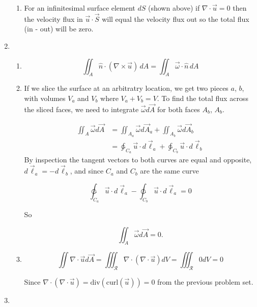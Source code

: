\documentclass[11pt,twoside]{article}
\newcommand{\vect}[1]{\vec{#1}}
\newcommand{\grad}{\nabla}
\newcommand{\cross}{\times}
\newcommand{\curl}{\mbox{curl}}
\newcommand{\divf}{\mbox{div}}
\newcommand{\lint}{\ointctrclockwise}
\begin{document}
\begin{enumerate}
\begin{enumerate}

\item For an infinitesimal surface element $dS$ (shown above) if $\grad\cdot\vect{u}=0$ then the velocity flux in $\vect{u}\cdot\vect{S}$ will equal the velocity flux out so the total flux (in - out) will be zero.

\end{enumerate}

%
%
\item
\begin{enumerate}
\item
$$\iint_A \hat{n}\cdot(\grad\cross\vect{u})\,dA = \iint_A\vect{\omega}\cdot\hat{n}\,dA$$


\item If we slice the surface at an arbitratry location, we get two pieces $a$, $b$, with volumes $V_a$ and $V_b$ where $V_a+V_b=V$.  To find the total flux across the sliced faces, we need to integrate $\vect{\omega}d\vect{A}$ for both faces $A_b$, $A_b$. 

\begin{align*}
\iint_A\vect{\omega}d\vect{A} &= \iint_{A_a}\vect{\omega}d\vect{A}_a + \iint_{A_b}\vect{\omega}d\vect{A}_b\\
&=\lint_{C_a}\vect{u}\cdot d\vect{\ell}_{a} + \lint_{C_b}\vect{u}\cdot d\vect{\ell}_{b}
\end{align*}
By inspection the tangent vectors to both curves are equal and opposite, $d\vect{\ell}_{a} = -d\vect{\ell}_{b}$, and since $C_a$ and $C_b$ are the same curve 

$$\lint_{C_a}\vect{u}\cdot d\vect{\ell}_{a} - \lint_{C_b}\vect{u}\cdot d\vect{\ell}_{a} = 0 $$

So 

$$\iint_A\vect{\omega}d\vect{A} = 0 .$$

\item 
$$\iint \grad\cdot\vect{u}d\vect{A} = \iiint_{\mathcal{R}}\grad\cdot(\grad\cdot\vect{u})dV = \iiint_{\mathcal{R}}0dV = 0$$

Since $\grad\cdot(\grad\cdot\vect{u}) = \divf(\curl(\vect{u})) = 0$ from the previous problem set. 

\end{enumerate}


%
%
\item 
\begin{enumerate}


\end{enumerate}
\end{enumerate}
\end{document}
